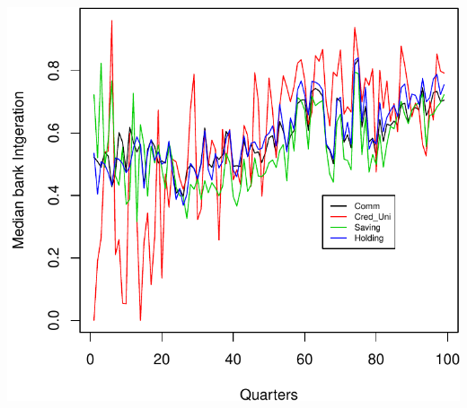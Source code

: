 \documentclass[11pt,]{article}
\begin{document}
\begin{center}\includegraphics{AC_US_Bank_Int_Results_1_files/figure-latex/SIC_Categ-1} \end{center}
\end{document}
